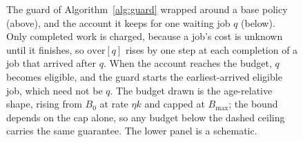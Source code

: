 \begin{figure}[htbp]
\caption{The guard of Algorithm~\ref{alg:guard} wrapped around a base policy (above), and
the account it keeps for one waiting job $q$ (below). Only completed work is charged, because
a job's cost is unknown until it finishes, so $\mathrm{over}[q]$ rises by one step at each
completion of a job that arrived after $q$. When the account reaches the budget, $q$ becomes
eligible, and the guard starts the earliest-arrived eligible job, which need not be $q$. The
budget drawn is the age-relative shape, rising from $B_0$ at rate $\eta k$ and capped at
$B_{\max}$; the bound depends on the cap alone, so any budget below the dashed ceiling
carries the same guarantee. The lower panel is a schematic.}
\label{fig:guard}
\end{figure}

